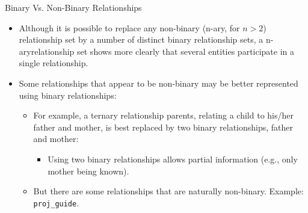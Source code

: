 \documentclass{beamer}
\begin{document}
\begin{frame}{Binary Vs. Non-Binary Relationships}
    \begin{itemize}
        \item Although it is possible to replace any non-binary (n-ary, for $n > 2$) relationship set by a number of distinct binary relationship sets, a n-aryrelationship set shows more clearly that several entities participate in a single relationship.
        \item Some relationships that appear to be non-binary may be better represented using binary relationships:
        \begin{itemize}
            \item For example, a ternary relationship parents, relating a child to his/her father and mother, is best replaced by two binary relationships, father and mother:
            \begin{itemize}
                \item Using two binary relationships allows partial information (e.g., only mother being known).
            \end{itemize}
            \item But there are some relationships that are naturally non-binary.  Example: \texttt{proj\_guide}.
        \end{itemize}
    \end{itemize}
\end{frame}
\end{document}
